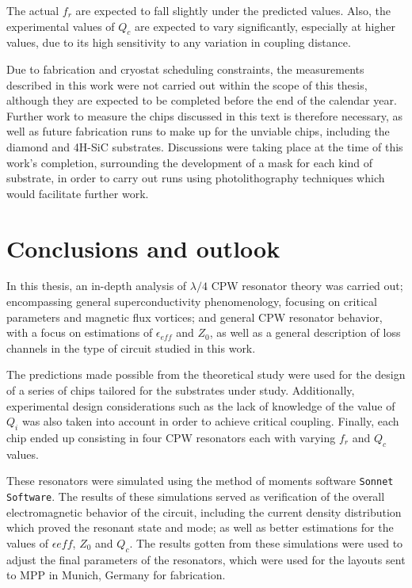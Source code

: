 \documentclass[12pt, a4paper]{article}
\begin{document}
The actual $f_r$ are expected to fall slightly under the predicted values. Also, the experimental values of $Q_c$ are expected to vary significantly, especially at higher values, due to its high sensitivity to any variation in coupling distance.

Due to fabrication and cryostat scheduling constraints, the measurements described in this work were not carried out within the scope of this thesis, although they are expected to be completed before the end of the calendar year. Further work to measure the chips discussed in this text is therefore necessary, as well as future fabrication runs to make up for the unviable chips, including the diamond and 4H-SiC substrates. Discussions were taking place at the time of this work's completion, surrounding the development of a mask for each kind of substrate, in order to carry out runs using photolithography techniques which would facilitate further work.

\section{Conclusions and outlook}

In this thesis, an in-depth analysis of $\lambda/4$ CPW resonator theory was carried out; encompassing general superconductivity phenomenology, focusing on critical parameters and magnetic flux vortices; and general CPW resonator behavior, with a focus on estimations of $\epsilon_{eff}$ and $Z_0$, as well as a general description of loss channels in the type of circuit studied in this work.

The predictions made possible from the theoretical study were used for the design of a series of chips tailored for the substrates under study. Additionally, experimental design considerations such as the lack of knowledge of the value of $Q_i$ was also taken into account in order to achieve critical coupling. Finally, each chip ended up consisting in four CPW resonators each with varying $f_r$ and $Q_c$ values.

These resonators were simulated using the method of moments software \texttt{Sonnet Software}. The results of these simulations served as verification of the overall electromagnetic behavior of the circuit, including the current density distribution which proved the resonant state and mode; as well as better estimations for the values of $\epsilon{eff}$, $Z_0$ and $Q_c$. The results gotten from these simulations were used to adjust the final parameters of the resonators, which were used for the layouts sent to MPP in Munich, Germany for fabrication.
\end{document}
